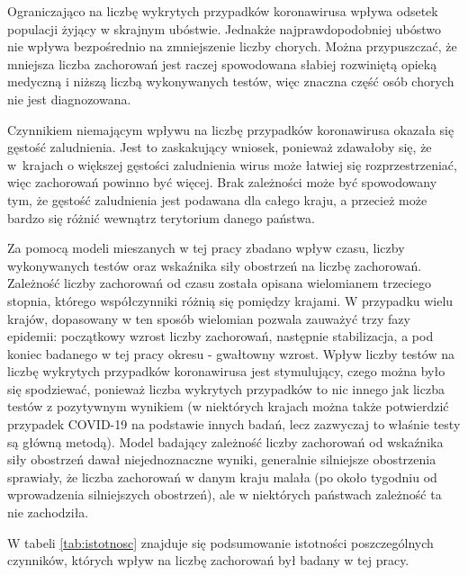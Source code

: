\documentclass[12pt]{mwbk}
\theoremstyle{plain}
\theoremstyle{definition}
\theoremstyle{definition}
\begin{document}
Ograniczająco na liczbę wykrytych przypadków koronawirusa wpływa odsetek populacji żyjący w skrajnym ubóstwie. Jednakże najprawdopodobniej ubóstwo nie wpływa bezpośrednio na zmniejszenie liczby chorych. Można przypuszczać, że mniejsza liczba zachorowań jest raczej spowodowana słabiej rozwiniętą opieką medyczną i niższą liczbą wykonywanych testów, więc znaczna część osób chorych nie jest diagnozowana.

Czynnikiem niemającym wpływu na liczbę przypadków koronawirusa okazała się gęstość zaludnienia. Jest to zaskakujący wniosek, ponieważ zdawałoby się, że w~krajach o większej gęstości zaludnienia wirus może łatwiej się rozprzestrzeniać, więc zachorowań powinno być więcej. Brak zależności może być spowodowany tym, że gęstość zaludnienia jest podawana dla całego kraju, a przecież może bardzo się różnić wewnątrz terytorium danego państwa.

Za pomocą modeli mieszanych w tej pracy zbadano wpływ czasu, liczby wykonywanych testów oraz wskaźnika siły obostrzeń na liczbę zachorowań. Zależność liczby zachorowań od czasu została opisana wielomianem trzeciego stopnia, którego współczynniki różnią się pomiędzy krajami. W przypadku wielu krajów, dopasowany w ten sposób wielomian pozwala zauważyć trzy fazy epidemii: początkowy wzrost liczby zachorowań, następnie stabilizacja, a pod koniec badanego w tej pracy okresu - gwałtowny wzrost. Wpływ liczby testów na liczbę wykrytych przypadków koronawirusa jest stymulujący, czego można było się spodziewać, ponieważ liczba wykrytych przypadków to nic innego jak liczba testów z pozytywnym wynikiem (w niektórych krajach można także potwierdzić przypadek COVID-19 na podstawie innych badań, lecz zazwyczaj to właśnie testy są główną metodą). Model badający zależność liczby zachorowań od wskaźnika siły obostrzeń dawał niejednoznaczne wyniki, generalnie silniejsze obostrzenia sprawiały, że liczba zachorowań w danym kraju malała (po około tygodniu od wprowadzenia silniejszych obostrzeń), ale w niektórych państwach zależność ta nie zachodziła.

W tabeli \ref{tab:istotnosc} znajduje się podsumowanie istotności poszczególnych czynników, których wpływ na liczbę zachorowań był badany w tej pracy.
\end{document}
